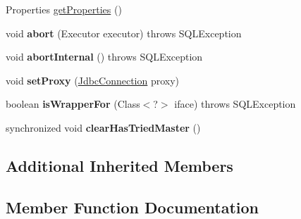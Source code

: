 \begin{DoxyCompactItemize}
Properties \mbox{\hyperlink{classcom_1_1mysql_1_1cj_1_1jdbc_1_1ha_1_1_replication_my_s_q_l_connection_a04a60b0695519e98a4827f90161f52da}{get\+Properties}} ()
\item 
\mbox{\label{classcom_1_1mysql_1_1cj_1_1jdbc_1_1ha_1_1_replication_my_s_q_l_connection_a862c7c014fbae13891910e2d0bcb907a}} 
void {\bfseries abort} (Executor executor)  throws S\+Q\+L\+Exception 
\item 
\mbox{\label{classcom_1_1mysql_1_1cj_1_1jdbc_1_1ha_1_1_replication_my_s_q_l_connection_a10917e3985284c676e558743b04a4adc}} 
void {\bfseries abort\+Internal} ()  throws S\+Q\+L\+Exception 
\item 
\mbox{\label{classcom_1_1mysql_1_1cj_1_1jdbc_1_1ha_1_1_replication_my_s_q_l_connection_af7d0735f7bca5fc4e4aa56f2037e7676}} 
void {\bfseries set\+Proxy} (\mbox{\hyperlink{interfacecom_1_1mysql_1_1cj_1_1jdbc_1_1_jdbc_connection}{Jdbc\+Connection}} proxy)
\item 
\mbox{\label{classcom_1_1mysql_1_1cj_1_1jdbc_1_1ha_1_1_replication_my_s_q_l_connection_a89f48d6730af4279fc4cb3d96cffd725}} 
boolean {\bfseries is\+Wrapper\+For} (Class$<$?$>$ iface)  throws S\+Q\+L\+Exception 
\item 
\mbox{\label{classcom_1_1mysql_1_1cj_1_1jdbc_1_1ha_1_1_replication_my_s_q_l_connection_aa198df19289a6a2ba3ae72ec55c10f62}} 
synchronized void {\bfseries clear\+Has\+Tried\+Master} ()
\end{DoxyCompactItemize}
\subsection*{Additional Inherited Members}


\subsection{Member Function Documentation}
\mbox{\label{classcom_1_1mysql_1_1cj_1_1jdbc_1_1ha_1_1_replication_my_s_q_l_connection_a42cf4364f5721814b388fa7bef9fb009}} 
